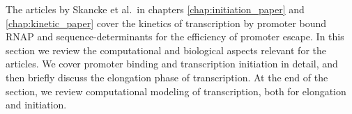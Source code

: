 %
The articles by Skancke et al.\ in chapters \ref{chap:initiation_paper} and
\ref{chap:kinetic_paper} cover the kinetics of transcription by promoter bound
RNAP and sequence-determinants for the efficiency of promoter escape. In this
section we review the computational and biological aspects relevant for the
articles. We cover promoter binding and transcription initiation in detail,
and then briefly discuss the elongation phase of transcription. At the end of
the section, we review computational modeling of transcription, both for
elongation and initiation.
